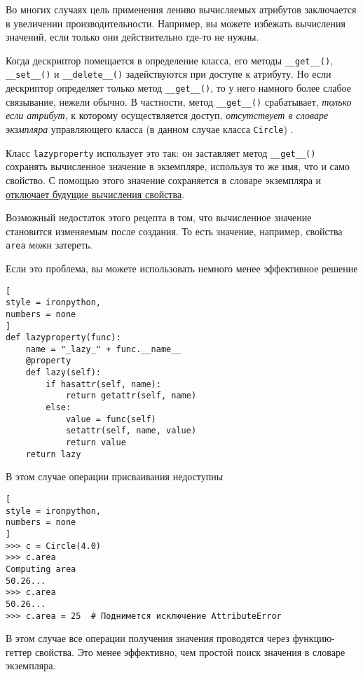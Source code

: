 \documentclass[%
	11pt,
	a4paper,
	utf8,
		]{article}
\begin{document}
Во многих случаях цель применения лениво вычисляемых атрибутов заключается в увеличении производительности. Например, вы можете избежать вычисления значений, если только они действительно где-то не нужны.

Когда дескриптор помещается в определение класса, его методы \verb|__get__()|, \verb|__set__()| и \verb|__delete__()| задействуются при доступе к атрибуту. Но если дескриптор определяет только метод \verb|__get__()|, то у него намного более слабое связывание, нежели обычно. В частности, метод \verb|__get__()| срабатывает, \emph{только если атрибут}, к которому осуществляется доступ, \emph{отсутствует в словаре экзмпляра} управляющего класса (в данном случае класса \texttt{Circle}) \cite[]{beazley:python_cookbook-2019}.

Класс \texttt{lazyproperty} использует это так: он заставляет метод \verb|__get__()| сохранять вычисленное значение в экземпляре, используя то же имя, что и само свойство. С помощью этого значение сохраняется в словаре экземпляра и \underline{отключает будущие вычисления свойства}.

Возможный недостаток этого рецепта в том, что вычисленное значение становится изменяемым после создания. То есть значение, например, свойства \texttt{area} можн затереть.

Если это проблема, вы можете использовать немного менее эффективное решение \cite[]{beazley:python_cookbook-2019}
\begin{lstlisting}[
style = ironpython,
numbers = none
]
def lazyproperty(func):
    name = "_lazy_" + func.__name__
    @property
    def lazy(self):
        if hasattr(self, name):
            return getattr(self, name)
        else:
            value = func(self)
            setattr(self, name, value)
            return value
    return lazy
\end{lstlisting}

В этом случае операции присваивания недоступны
\begin{lstlisting}[
style = ironpython,
numbers = none
]
>>> c = Circle(4.0)
>>> c.area
Computing area
50.26...
>>> c.area
50.26...
>>> c.area = 25  # Поднимется исключение AttributeError
\end{lstlisting}

В этом случае все операции получения значения проводятся через функцию-геттер свойства. Это менее эффективно, чем простой поиск значения в словаре экземпляра.
\end{document}
